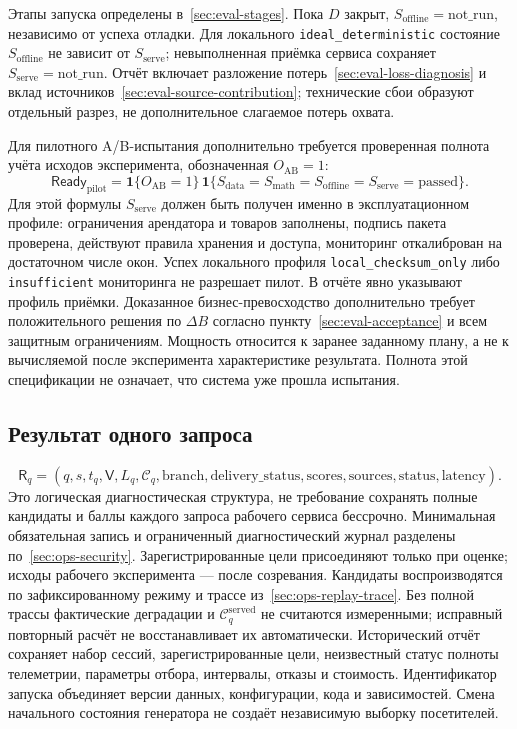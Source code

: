 \documentclass[12pt,a4paper]{article}
\newcommand{\code}[1]{{\ttfamily\small\nolinkurl{#1}}}
\newcommand{\ind}{\mathbf 1}
\theoremstyle{plainru}
\begin{document}
Этапы запуска определены в~\ref{sec:eval-stages}. Пока $D$ закрыт,
$S_{\mathrm{offline}}=\mathrm{not\_run}$, независимо от успеха отладки.
Для локального \code{ideal_deterministic} состояние
$S_{\mathrm{offline}}$ не зависит от $S_{\mathrm{serve}}$;
невыполненная приёмка сервиса сохраняет $S_{\mathrm{serve}}=\mathrm{not\_run}$.
Отчёт включает разложение потерь~\ref{sec:eval-loss-diagnosis}
и вклад источников~\ref{sec:eval-source-contribution}; технические сбои
образуют отдельный разрез, не дополнительное слагаемое потерь охвата.

Для пилотного A/B-испытания дополнительно требуется проверенная
полнота учёта исходов эксперимента, обозначенная $O_{\mathrm{AB}}=1$:
\begin{equation}\label{eq:acceptance-pilot}
\mathsf{Ready}_{\mathrm{pilot}}=
\ind\{O_{\mathrm{AB}}=1\}\,
\ind\{S_{\mathrm{data}}=S_{\mathrm{math}}=
S_{\mathrm{offline}}=S_{\mathrm{serve}}=\mathrm{passed}\}.
\end{equation}
Для этой формулы $S_{\mathrm{serve}}$ должен быть получен именно
в эксплуатационном профиле: ограничения арендатора и товаров заполнены,
подпись пакета проверена, действуют правила хранения и доступа,
мониторинг откалиброван на достаточном числе окон. Успех локального
профиля \code{local_checksum_only} либо \code{insufficient} мониторинга
не разрешает пилот. В отчёте явно указывают профиль приёмки.
Доказанное бизнес-превосходство дополнительно требует положительного
решения по \(\Delta B\) согласно пункту~\ref{sec:eval-acceptance}
и всем защитным ограничениям. Мощность относится к заранее заданному
плану, а не к вычисляемой после эксперимента характеристике результата.
Полнота этой спецификации не означает, что система уже прошла испытания.

\subsection{Результат одного запроса}

\begin{equation}\label{eq:acceptance-request-result}
\mathsf R_q=(q,s,t_q,\mathsf V,L_q,\mathcal C_q,
\mathrm{branch},\mathrm{delivery\_status},
\mathrm{scores},\mathrm{sources},\mathrm{status},\mathrm{latency}).
\end{equation}
Это логическая диагностическая структура, не требование сохранять
полные кандидаты и баллы каждого запроса рабочего сервиса бессрочно.
Минимальная обязательная запись и ограниченный диагностический журнал
разделены по~\ref{sec:ops-security}. Зарегистрированные цели присоединяют
только при оценке; исходы рабочего эксперимента --- после созревания.
Кандидаты воспроизводятся по зафиксированному режиму
и трассе из~\ref{sec:ops-replay-trace}. Без полной трассы фактические
деградации и $\mathcal C_q^{\mathrm{served}}$ не считаются измеренными;
исправный повторный расчёт не восстанавливает их автоматически.
Исторический отчёт сохраняет набор сессий, зарегистрированные цели,
неизвестный статус полноты телеметрии, параметры отбора,
интервалы, отказы и стоимость. Идентификатор запуска объединяет версии
данных, конфигурации, кода и зависимостей. Смена начального состояния
генератора не создаёт независимую выборку посетителей.
\end{document}
